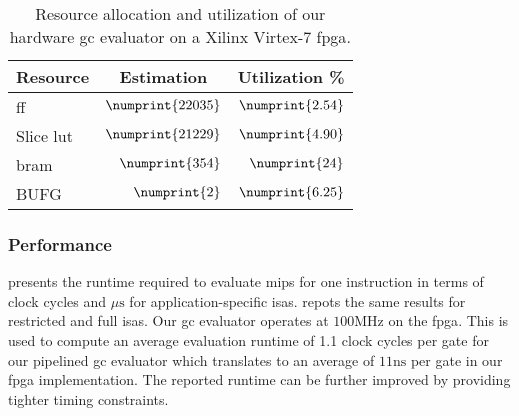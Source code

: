 \begin{table}
\centering
\caption{Resource allocation and utilization of our hardware \acrshort{gc} evaluator on a Xilinx Virtex-7 \acrshort{fpga}.}
\label{table:resource}
\begin{tabular}{l|r|r}
Resource    & \multicolumn{1}{c|}{Estimation} & \multicolumn{1}{c}{Utilization \%} \\ \hline \hline
\acrfull{ff} & $\numprint{22035}$ & $\numprint{2.54}$ \\ \hline
Slice \acrfull{lut} & $\numprint{21229}$ & $\numprint{4.90}$ \\ \hline
\acrshort{bram} & $\numprint{354}$ & $\numprint{24}$
\\ \hline
BUFG & $\numprint{2}$ & $\numprint{6.25}$
 \end{tabular}
\end{table}

\subsubsection{Performance}
 presents the runtime required to evaluate \acrshort{mips} for one instruction in terms of clock cycles and $\mu\textrm{s}$ for application-specific \acrshort{isa}s.
 repots the same results for restricted and full \acrshort{isa}s.
Our \acrshort{gc} evaluator operates at $100\textrm{MHz}$ on the \acrshort{fpga}.
This is used to compute an average evaluation runtime of 1.1 clock cycles per gate for our pipelined \acrshort{gc} evaluator which translates to an average of $11\textrm{ns}$ per gate in our \acrshort{fpga} implementation.
The reported runtime can be further improved by providing tighter timing constraints.

